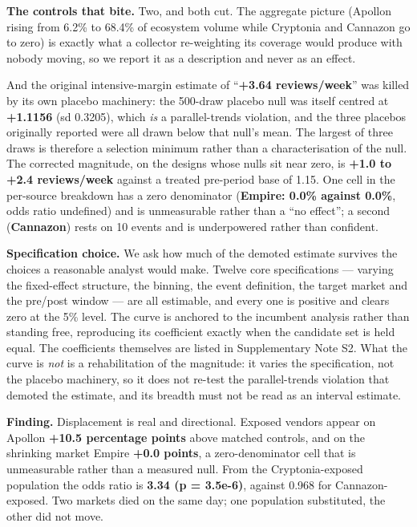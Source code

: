 \textbf{The controls that bite.} Two, and both cut. The aggregate picture
(Apollon rising from 6.2\% to 68.4\% of ecosystem volume while Cryptonia and
Cannazon go to zero) is exactly what a collector re-weighting its coverage would
produce with nobody moving, so we report it as a description and never as an
effect.

And the original intensive-margin estimate of ``\textbf{+3.64 reviews/week}''
was killed by its own placebo machinery: the 500-draw placebo null was itself
centred at \textbf{+1.1156} (sd 0.3205), which \emph{is} a parallel-trends
violation, and the three placebos originally reported were all drawn below that
null's mean. The largest of three draws is therefore a selection minimum rather
than a characterisation of the null. The corrected magnitude, on the designs
whose nulls sit near zero, is \textbf{+1.0 to +2.4 reviews/week} against a
treated pre-period base of 1.15. One cell in the per-source breakdown
has a zero denominator (\textbf{Empire: 0.0\% against 0.0\%}, odds ratio
undefined) and is unmeasurable rather than a ``no effect''; a second
(\textbf{Cannazon}) rests on 10 events and is underpowered rather than confident.

\textbf{Specification choice.} We ask how much of the demoted estimate survives
the choices a reasonable analyst would make. Twelve core specifications ---
varying the fixed-effect structure, the binning, the event definition, the
target market and the pre/post window --- are all estimable, and every one is
positive and clears zero at the 5\% level. The curve is anchored to the
incumbent analysis rather than standing free, reproducing its coefficient
exactly when the candidate set is held equal. The coefficients themselves are
listed in Supplementary Note S2. What the curve is \emph{not} is a
rehabilitation of the magnitude: it varies the specification, not the placebo
machinery, so it does not re-test the parallel-trends violation that demoted the
estimate, and its breadth must not be read as an interval estimate.

\textbf{Finding.} Displacement is real and directional. Exposed vendors appear
on Apollon \textbf{+10.5 percentage points} above matched controls, and on the
shrinking market Empire \textbf{+0.0 points}, a zero-denominator cell that is
unmeasurable rather than a measured null. From the Cryptonia-exposed population
the odds ratio is \textbf{3.34 (p = 3.5e-6)}, against 0.968 for
Cannazon-exposed. Two markets died on the same day; one population substituted,
the other did not move.

